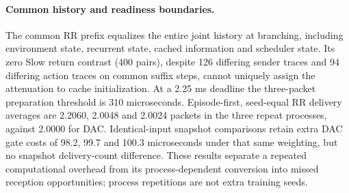 \paragraph{Common history and readiness boundaries.}
The common RR prefix equalizes the entire joint history at branching, including environment state, recurrent state, cached information and scheduler state. Its zero Slow return contrast (400 pairs), despite 126 differing sender traces and 94 differing action traces on common suffix steps, cannot uniquely assign the attenuation to cache initialization. At a 2.25 ms deadline the three-packet preparation threshold is 310 microseconds. Episode-first, seed-equal RR delivery averages are 2.2060, 2.0048 and 2.0024 packets in the three repeat processes, against 2.0000 for DAC. Identical-input snapshot comparisons retain extra DAC gate costs of 98.2, 99.7 and 100.3 microseconds under that same weighting, but no snapshot delivery-count difference. These results separate a repeated computational overhead from its process-dependent conversion into missed reception opportunities; process repetitions are not extra training seeds.
